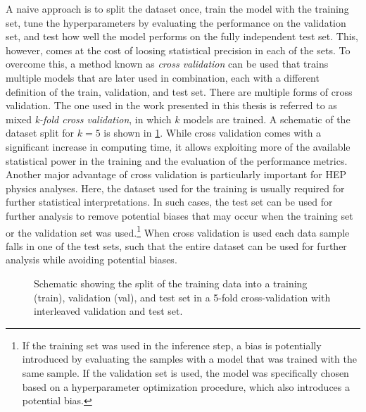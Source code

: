 A naive approach is to split the dataset once, train the model with the training set, tune the hyperparameters by evaluating the performance on the validation set, and test how well the model performs on the fully independent test set. 
This, however, comes at the cost of loosing statistical precision in each of the sets. 
To overcome this, a method known as \emph{cross validation} can be used that trains multiple models that are later used in combination, each with a different definition of the train, validation, and test set.
There are multiple forms of cross validation. The one used in the work presented in this thesis is referred to as mixed \emph{k-fold cross validation}, in which $k$ models are trained. A schematic of the dataset split for $k=5$ is shown in \cref{fig:k-fold-method}. 
While cross validation comes with a significant increase in computing time, it allows exploiting more of the available statistical power in the training and the evaluation of the performance metrics.
Another major advantage of cross validation is particularly important for HEP physics analyses. 
Here, the dataset used for the training is usually required for further statistical interpretations. In such cases, the test set can be used for further analysis to remove potential biases that may occur when the training set or the validation set was used.\footnote{If the training set was used in the inference step, a bias is potentially introduced by evaluating the samples with a model that was trained with the same sample. If the validation set is used, the model was specifically chosen based on a hyperparameter optimization procedure, which also introduces a potential bias.}
When cross validation is used each data sample falls in one of the test sets, such that the entire dataset can be used for further analysis while avoiding potential biases.

\begin{figure}[t]
    \caption{Schematic showing the split of the training data into a training (train), validation (val), and test set in a 5-fold cross-validation with interleaved validation and test set.}
    \label{fig:k-fold-method}
\end{figure}


